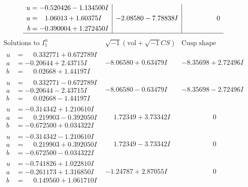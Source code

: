 \documentclass[1p]{elsarticle_modified}
\theoremstyle{definition}
\newcommand{\I}{\sqrt{-1}}
\begin{document}
$$\begin{array}{c|c|c}
\begin{aligned}
u &= -0.520426 - 1.134500 I \\
a &= \phantom{-}1.06013 + 1.60375 I \\
b &= -0.390004 + 1.272450 I\end{aligned}
 & -2.08580 - 7.78838 I & \phantom{-0.000000 } 0\\
 \hline 
 \end{array}$$\newpage$$\begin{array}{c|c|c}  
\text{Solutions to }I^u_{1}& \I (\text{vol} + \sqrt{-1}CS) & \text{Cusp shape}\\
 \hline 
\begin{aligned}
u &= \phantom{-}0.332771 + 0.672789 I \\
a &= -0.20644 + 2.43715 I \\
b &= \phantom{-}0.02668 + 1.44197 I\end{aligned}
 & -8.06580 + 0.63479 I & -8.35698 + 2.72496 I \\ \hline\begin{aligned}
u &= \phantom{-}0.332771 - 0.672789 I \\
a &= -0.20644 - 2.43715 I \\
b &= \phantom{-}0.02668 - 1.44197 I\end{aligned}
 & -8.06580 - 0.63479 I & -8.35698 - 2.72496 I \\ \hline\begin{aligned}
u &= -0.314342 + 1.210610 I \\
a &= \phantom{-}0.219903 - 0.392050 I \\
b &= -0.672500 + 0.034322 I\end{aligned}
 & \phantom{-}1.72349 + 3.73342 I & \phantom{-0.000000 } 0 \\ \hline\begin{aligned}
u &= -0.314342 - 1.210610 I \\
a &= \phantom{-}0.219903 + 0.392050 I \\
b &= -0.672500 - 0.034322 I\end{aligned}
 & \phantom{-}1.72349 - 3.73342 I & \phantom{-0.000000 } 0 \\ \hline\begin{aligned}
u &= -0.741826 + 1.022810 I \\
a &= -0.261173 + 1.316850 I \\
b &= \phantom{-}0.149560 + 1.061710 I\end{aligned}
 & -1.24787 + 2.87055 I & \phantom{-0.000000 } 0 \\ \hline\begin{aligned}

\end{aligned}
\end{array}$$
\end{document}
